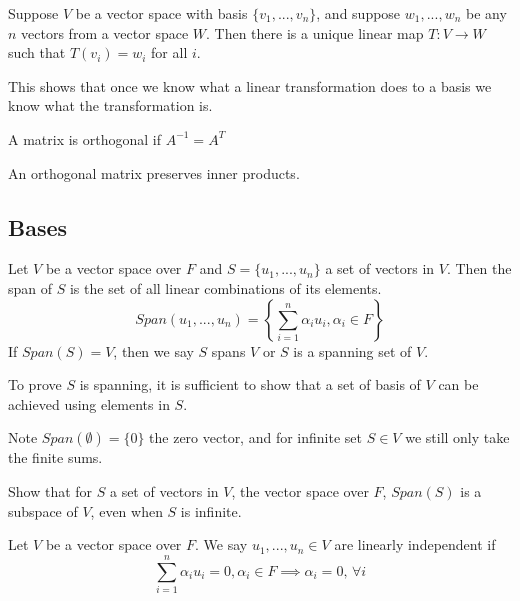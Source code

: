 \documentclass[11pt]{article}
\begin{document}
\begin{theorem}
  Suppose \(V\) be a vector space with basis \(\{v_1,...,v_n\}\), and suppose \(w_1,...,w_n\) be any \(n\) vectors from a vector space \(W\). Then there is a unique linear map \(T:V\to W\) such that \(T(v_i)=w_i\) for all \(i\).
\end{theorem}
This shows that once we know what a linear transformation does to a basis we know what the transformation is.

\begin{definition}
  A matrix is orthogonal if \(A^{-1}=A^{T}\)
\end{definition}

\begin{proposition}
  An orthogonal matrix preserves inner products.
\end{proposition}

\subsection{Bases}
\begin{definition}[Span]
  Let \(V\) be a vector space over \(F\) and \(S=\{u_1,...,u_n\}\) a set of vectors in \(V\). Then the span of \(S\) is the set of all linear combinations of its elements. 
  \[Span(u_1,...,u_n)=\left\{\sum_{i=1}^n \alpha_iu_i,\alpha_i\in F\right\}\]
  If \(Span(S)=V\), then we say \(S\) spans \(V\) or \(S\) is a spanning set of \(V\).
\end{definition}

To prove \(S\) is spanning, it is sufficient to show that a set of basis of \(V\) can be achieved using elements in \(S\).

Note \(Span(\emptyset)=\{0\}\) the zero vector, and for infinite set \(S\in V\) we still only take the finite sums. 

\begin{exercise}
  Show that for \(S\) a set of vectors in \(V\), the vector space over \(F\), \(Span(S)\) is a subspace of \(V\), even when \(S\) is infinite.
\end{exercise}
\begin{solution}
\end{solution}

\begin{definition}
  Let \(V\) be a vector space over \(F\). We say \(u_1,...,u_n\in V\) are linearly independent if
  \[\sum_{i=1}^n\alpha_iu_i=0,\alpha_i\in F \implies \alpha_i=0,\, \forall i\] 
\end{definition}
\end{document}
